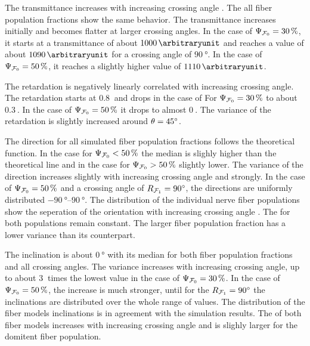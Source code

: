 % 
The transmittance increases with increasing crossing angle \modelOmega{}.
The all fiber population fractions \modelPsi{} show the same behavior.
The transmittance increases initially and becomes flatter at larger crossing angles.
In the case of $\textnormal{$\Psi_{\textnormal{$\mathcal{F}_0$}}$} = \SI{30}{\percent}$, it starts at a transmittance of about $\SI{1000}{\arbitraryunit}$ and reaches a value of about $\SI{1090}{\arbitraryunit}$ for a crossing angle of $\SI{90}{\degree}$.
In the case of $\textnormal{$\Psi_{\textnormal{$\mathcal{F}_0$}}$} = \SI{50}{\percent}$, it reaches a slightly higher value of $\SI{1110}{\arbitraryunit}$.
\par
The retardation is negatively linearly correlated with increasing crossing angle.
The retardation starts at $\SI{0.8}{}$ and drops in the case of For $\textnormal{$\Psi_{\textnormal{$\mathcal{F}_0$}}$}=\SI{30}{\percent}$ to about $\SI{0.3}{}$.
In the case of $\textnormal{$\Psi_{\textnormal{$\mathcal{F}_0$}}$}=\SI{50}{\percent}$ it drops to almost $\SI{0}{}$.
The variance of the retardation is slightly increased around $\textnormal{$\theta$}=\SI{45}{\degree}$.
\par
The direction for all simulated fiber population fractions \modelPsi{} follows the theoretical  function.
In the case for $\textnormal{$\Psi_{\textnormal{$\mathcal{F}_0$}}$}<\SI{50}{\percent}$ the median is slighly higher than the theoretical line and in the case for $\textnormal{$\Psi_{\textnormal{$\mathcal{F}_0$}}$}>\SI{50}{\percent}$ slightly lower.
The variance of the direction increases slightly with increasing crossing angle and strongly.
In the case of $\textnormal{$\Psi_{\textnormal{$\mathcal{F}_0$}}$}=\SI{50}{\percent}$ and a crossing angle of $\textnormal{$R_{\textnormal{$\mathcal{F}_1$}}$} = \SI{90}{\degree}$, the directions are uniformly distributed $\SIrange{-90}{90}{\degree}$.
The distribution of the individual nerve fiber populations show the seperation of the orientation with increasing crossing angle \modelOmega{}.
The \bvariance{} for both populations remain constant. 
The larger fiber population fraction has a lower variance than its counterpart.
\par
The inclination is about $\SI{0}{\degree}$ with its median for both fiber population fractions and all crossing angles.
The variance increases with increasing crossing angle, up to about $\SI{3}{}$ times the lowest value in the case of $\textnormal{$\Psi_{\textnormal{$\mathcal{F}_0$}}$} = \SI{30}{\percent}$.
In the case of $\textnormal{$\Psi_{\textnormal{$\mathcal{F}_0$}}$} = \SI{50}{\percent}$, the increase is much stronger, until for the $\textnormal{$R_{\textnormal{$\mathcal{F}_1$}}$}=\SI{90}{\degree}$ the inclinations are distributed over the whole range of values.
The distribution of the fiber models inclinations is in agreement with the simulation results.
The \bvariance{} of both fiber models increases with increasing crossing angle and is slighly larger for the domitent fiber population.
